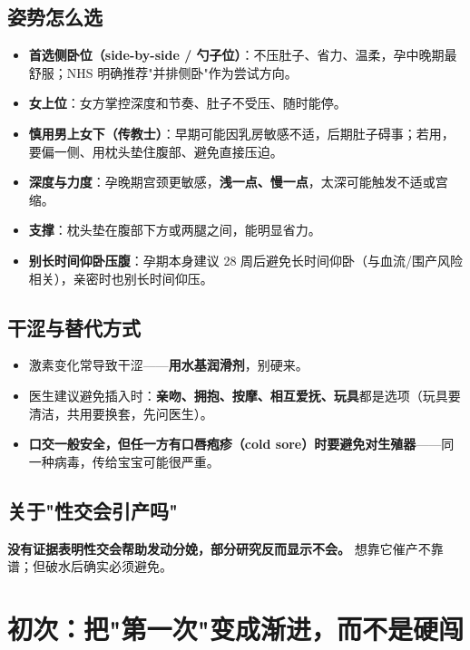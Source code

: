 \subsection{姿势怎么选}

\begin{itemize}[leftmargin=2em,itemsep=0.3em]
  \item \textbf{首选侧卧位（side-by-side / 勺子位）}：不压肚子、省力、温柔，孕中晚期最舒服；NHS 明确推荐"并排侧卧"作为尝试方向。
  \item \textbf{女上位}：女方掌控深度和节奏、肚子不受压、随时能停。
  \item \textbf{慎用男上女下（传教士）}：早期可能因乳房敏感不适，后期肚子碍事；若用，要偏一侧、用枕头垫住腹部、避免直接压迫。
  \item \textbf{深度与力度}：孕晚期宫颈更敏感，\textbf{浅一点、慢一点}，太深可能触发不适或宫缩。
  \item \textbf{支撑}：枕头垫在腹部下方或两腿之间，能明显省力。
  \item \textbf{别长时间仰卧压腹}：孕期本身建议 28 周后避免长时间仰卧（与血流/围产风险相关），亲密时也别长时间仰压。
\end{itemize}

\subsection{干涩与替代方式}

\begin{itemize}[leftmargin=2em,itemsep=0.3em]
  \item 激素变化常导致干涩——\textbf{用水基润滑剂}，别硬来。
  \item 医生建议避免插入时：\textbf{亲吻、拥抱、按摩、相互爱抚、玩具}都是选项（玩具要清洁，共用要换套，先问医生）。
  \item \textbf{口交一般安全，但任一方有口唇疱疹（cold sore）时要避免对生殖器}——同一种病毒，传给宝宝可能很严重。
\end{itemize}

\subsection{关于"性交会引产吗"}

\textbf{没有证据表明性交会帮助发动分娩，部分研究反而显示不会。} 想靠它催产不靠谱；但破水后确实必须避免。

\section{初次：把"第一次"变成渐进，而不是硬闯}

